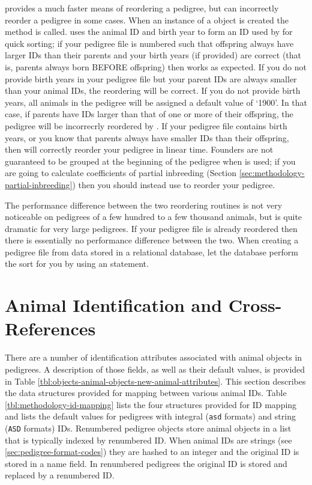  provides a much faster means of reordering a pedigree, but can incorrectly reorder a pedigree in some cases.  When an instance of a  object is created the  method is called.   uses the animal ID and birth year to form an ID used by  for quick sorting; if your pedigree file is numbered such that offspring always have larger IDs than their parents and your birth years (if provided) are correct (that is, parents always born BEFORE offspring) then  works as expected.  If you do not provide birth years in your pedigree file but your parent IDs are always smaller than your animal IDs, the reordering will be correct.  If you do not provide birth years, all animals in the pedigree will be assigned a default value of `1900'.  In that case, if parents have IDs larger than that of one or more of their offspring, the pedigree will be incorrecrly reordered by .  If your pedigree file contains birth years, or you know that parents always have smaller IDs than their offspring, then  will correctly reorder your pedigree in linear time. Founders
are not guaranteed to be grouped at the beginning of the pedigree when
 is used; if you are going to calculate coefficients of
partial inbreeding (Section \ref{sec:methodology-partial-inbreeding}) then you should
instead use  to reorder your pedigree.

The performance difference between the two reordering routines is not very noticeable on pedigrees of a few hundred to a few thousand animals, but is quite dramatic for very large pedigrees. If your pedigree file is already reordered then there is essentially no performance difference between the two. When creating a pedigree file from data stored in a relational database, let the database perform the sort for you by using an  statement.

\section{Animal Identification and Cross-References}
\label{sec:methodology-id-mapping}
There are a number of identification attributes associated with animal objects in \PyPedal{} pedigrees. A description of those fields, as well as their default values, is provided in Table \ref{tbl:objects-animal-objects-new-animal-attributes}. This section describes the data structures provided for mapping between various animal IDs. Table \ref{tbl:methodology-id-mapping} lists the four structures provided for ID mapping and lists the default values for pedigrees with integral (\texttt{asd} formats) and string (\texttt{ASD} formats) IDs. Renumbered \PyPedal{} pedigree objects store animal objects in a list that is typically indexed by renumbered ID. When animal IDs are strings (see \ref{sec:pedigree-format-codes}) they are hashed to an integer and the original ID is stored in a name field. In renumbered pedigrees the original ID is stored and replaced by a renumbered ID.

